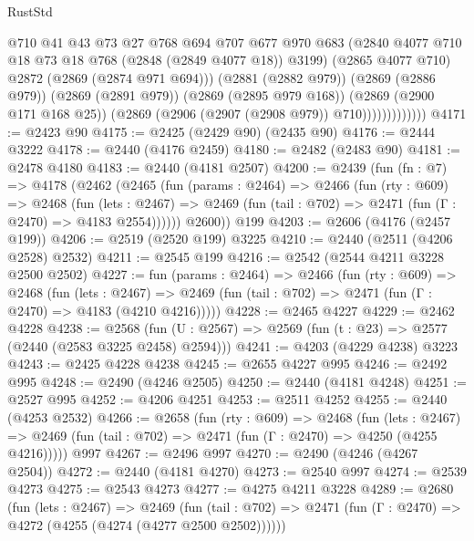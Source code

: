 \begin{lexlean}{RustStd}
\begin{coremodule}
{\begin{coremodule}
{{{{{{{{{{{{                            @710
                            @41
                            @43
                            @73
                            @27
                            @768
                            @694
                            @707
                            @677
                            @970
                            @683
                            (@2840 @4077 @710 @18 @73 @18 @768 (@2848 (@2849 @4077 @18)) @3199)
                            (@2865 @4077 @710)
                            @2872
                            (@2869 (@2874 @971 @694)))
                          (@2881 (@2882 @979))
                          (@2869 (@2886 @979))
                          (@2869 (@2891 @979))
                          (@2869 (@2895 @979 @168))
                          (@2869 (@2900 @171 @168 @25))
                          (@2869 (@2906 (@2907 (@2908 @979)) @710)))))))))))))
@4171 := @2423 @90
@4175 := @2425 (@2429 @90) (@2435 @90)
@4176 := @2444 @3222
@4178 := @2440 (@4176 @2459)
@4180 := @2482 (@2483 @90)
@4181 := @2478 @4180
@4183 := @2440 (@4181 @2507)
@4200 := @2439
    (fun (fn : @7) =>
    @4178
      (@2462
        (@2465
          (fun (params : @2464) =>
          @2466
            (fun (rty : @609) =>
            @2468
              (fun (lets : @2467) =>
              @2469 (fun (tail : @702) => @2471 (fun (Γ : @2470) => @4183 @2554))))))
        @2600))
    @199
@4203 := @2606 (@4176 (@2457 @199))
@4206 := @2519 (@2520 @199) @3225
@4210 := @2440 (@2511 (@4206 @2528) @2532)
@4211 := @2545 @199
@4216 := @2542 (@2544 @4211 @3228 @2500 @2502)
@4227 := fun (params : @2464) =>
  @2466
    (fun (rty : @609) =>
    @2468
      (fun (lets : @2467) =>
      @2469 (fun (tail : @702) => @2471 (fun (Γ : @2470) => @4183 (@4210 @4216)))))
@4228 := @2465 @4227
@4229 := @2462 @4228
@4238 := @2568 (fun (U : @2567) => @2569 (fun (t : @23) => @2577 (@2440 (@2583 @3225 @2458) @2594)))
@4241 := @4203 (@4229 @4238) @3223
@4243 := @2425 @4228 @4238
@4245 := @2655 @4227 @995
@4246 := @2492 @995
@4248 := @2490 (@4246 @2505)
@4250 := @2440 (@4181 @4248)
@4251 := @2527 @995
@4252 := @4206 @4251
@4253 := @2511 @4252
@4255 := @2440 (@4253 @2532)
@4266 := @2658
    (fun (rty : @609) =>
    @2468
      (fun (lets : @2467) =>
      @2469 (fun (tail : @702) => @2471 (fun (Γ : @2470) => @4250 (@4255 @4216)))))
    @997
@4267 := @2496 @997
@4270 := @2490 (@4246 (@4267 @2504))
@4272 := @2440 (@4181 @4270)
@4273 := @2540 @997
@4274 := @2539 @4273
@4275 := @2543 @4273
@4277 := @4275 @4211 @3228
@4289 := @2680
    (fun (lets : @2467) =>
    @2469
      (fun (tail : @702) => @2471 (fun (Γ : @2470) => @4272 (@4255 (@4274 (@4277 @2500 @2502))))))
}}}}}}}}}}}}
\end{coremodule}}
\end{coremodule}
\end{lexlean}
